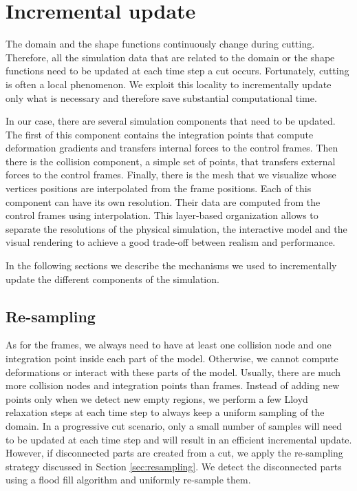 \section{Incremental update} \label{sec:incremental}

The domain and the shape functions continuously change during cutting. Therefore, all the simulation data that are related to the domain or the shape functions need to be updated at each time step a cut occurs. Fortunately, cutting is often a local phenomenon. We exploit this locality to incrementally update only what is necessary and therefore save substantial computational time.

In our case, there are several simulation components that need to be updated. The first of this component contains the integration points that compute deformation gradients and transfers internal forces to the control frames. Then there is the collision component, a simple set of points, that transfers external forces to the control frames. Finally, there is the mesh that we visualize whose vertices positions are interpolated from the frame positions. Each of this component can have its own resolution. Their data are computed from the control frames using interpolation. This layer-based organization allows to separate the resolutions of the physical simulation, the interactive model and the visual rendering to achieve a good trade-off between realism and performance.

In the following sections we describe the mechanisms we used to incrementally update the different components of the simulation.

\subsection{Re-sampling}
\label{sec:all_resampling}
As for the frames, we always need to have at least one collision node and one integration point inside each part of the model. Otherwise, we cannot compute deformations or interact with these parts of the model. Usually, there are much more collision nodes and integration points than frames. Instead of adding new points only when we detect new empty regions, we perform a few Lloyd relaxation steps at each time step to always keep a uniform sampling of the domain. In a progressive cut scenario, only a small number of samples will need to be updated at each time step and will result in an efficient incremental update. However, if disconnected parts are created from a cut, we apply the re-sampling strategy discussed in Section \ref{sec:resampling}. We detect the disconnected parts using a flood fill algorithm and uniformly re-sample them.

